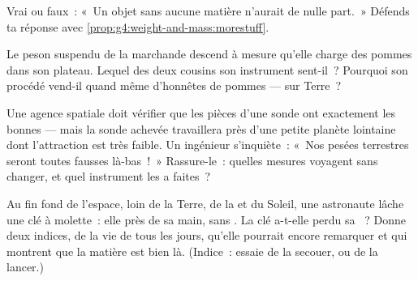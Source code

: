 \begin{exercise}[$\star$]\label{exo:g4:weight-and-mass:8}
Vrai ou faux~: «~Un objet sans aucune matière n'aurait de  nulle
part.~» Défends ta réponse avec
\cref{prop:g4:weight-and-mass:morestuff}.
\end{exercise}

\begin{exercise}[$\star$]\label{exo:g4:weight-and-mass:9}
Le peson suspendu de la marchande descend à mesure qu'elle charge des
pommes dans son plateau. Lequel des deux cousins son instrument
sent-il~? Pourquoi son procédé vend-il quand même d'honnêtes
 de pommes --- sur Terre~?
\end{exercise}

\begin{exercise}[$\star\star$]\label{exo:g4:weight-and-mass:10}
Une agence spatiale doit vérifier que les pièces d'une sonde ont
exactement les bonnes  --- mais la sonde achevée travaillera
près d'une petite planète lointaine dont l'attraction est très
faible. Un ingénieur s'inquiète~: «~Nos pesées terrestres seront
toutes fausses là-bas~!~» Rassure-le~: quelles mesures voyagent sans
changer, et quel instrument les a faites~?
\end{exercise}

\begin{exercise}[$\star\star$]\label{exo:g4:weight-and-mass:11}
Au fin fond de l'espace, loin de la Terre, de la  et du Soleil,
une astronaute lâche une clé à molette~: elle  près de sa main,
sans . La clé a-t-elle perdu sa ~? Donne deux indices, de
la vie de tous les jours, qu'elle pourrait encore remarquer et qui
montrent que la matière est bien là. (Indice~: essaie de la secouer,
ou de la lancer.)
\end{exercise}
